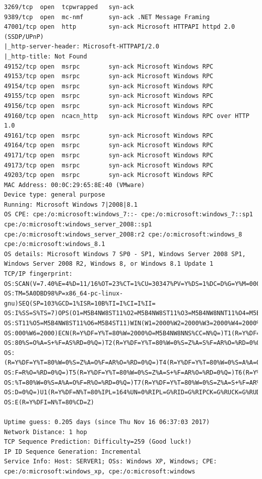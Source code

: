\documentclass[12pt,a4paper]{article}
\begin{document}
\begin{appendices}
\begin{lstlisting}
3269/tcp  open  tcpwrapped   syn-ack
9389/tcp  open  mc-nmf       syn-ack .NET Message Framing
47001/tcp open  http         syn-ack Microsoft HTTPAPI httpd 2.0 (SSDP/UPnP)
|_http-server-header: Microsoft-HTTPAPI/2.0
|_http-title: Not Found
49152/tcp open  msrpc        syn-ack Microsoft Windows RPC
49153/tcp open  msrpc        syn-ack Microsoft Windows RPC
49154/tcp open  msrpc        syn-ack Microsoft Windows RPC
49155/tcp open  msrpc        syn-ack Microsoft Windows RPC
49156/tcp open  msrpc        syn-ack Microsoft Windows RPC
49160/tcp open  ncacn_http   syn-ack Microsoft Windows RPC over HTTP 1.0
49161/tcp open  msrpc        syn-ack Microsoft Windows RPC
49164/tcp open  msrpc        syn-ack Microsoft Windows RPC
49171/tcp open  msrpc        syn-ack Microsoft Windows RPC
49173/tcp open  msrpc        syn-ack Microsoft Windows RPC
49203/tcp open  msrpc        syn-ack Microsoft Windows RPC
MAC Address: 00:0C:29:65:8E:40 (VMware)
Device type: general purpose
Running: Microsoft Windows 7|2008|8.1
OS CPE: cpe:/o:microsoft:windows_7::- cpe:/o:microsoft:windows_7::sp1 cpe:/o:microsoft:windows_server_2008::sp1 cpe:/o:microsoft:windows_server_2008:r2 cpe:/o:microsoft:windows_8 cpe:/o:microsoft:windows_8.1
OS details: Microsoft Windows 7 SP0 - SP1, Windows Server 2008 SP1, Windows Server 2008 R2, Windows 8, or Windows 8.1 Update 1
TCP/IP fingerprint:
OS:SCAN(V=7.40%E=4%D=11/16%OT=23%CT=1%CU=30347%PV=Y%DS=1%DC=D%G=Y%M=000C29%
OS:TM=5A0DBD98%P=x86_64-pc-linux-gnu)SEQ(SP=103%GCD=1%ISR=10B%TI=I%CI=I%II=
OS:I%SS=S%TS=7)OPS(O1=M5B4NW8ST11%O2=M5B4NW8ST11%O3=M5B4NW8NNT11%O4=M5B4NW8
OS:ST11%O5=M5B4NW8ST11%O6=M5B4ST11)WIN(W1=2000%W2=2000%W3=2000%W4=2000%W5=2
OS:000%W6=2000)ECN(R=Y%DF=Y%T=80%W=2000%O=M5B4NW8NNS%CC=N%Q=)T1(R=Y%DF=Y%T=
OS:80%S=O%A=S+%F=AS%RD=0%Q=)T2(R=Y%DF=Y%T=80%W=0%S=Z%A=S%F=AR%O=%RD=0%Q=)T3
OS:(R=Y%DF=Y%T=80%W=0%S=Z%A=O%F=AR%O=%RD=0%Q=)T4(R=Y%DF=Y%T=80%W=0%S=A%A=O%
OS:F=R%O=%RD=0%Q=)T5(R=Y%DF=Y%T=80%W=0%S=Z%A=S+%F=AR%O=%RD=0%Q=)T6(R=Y%DF=Y
OS:%T=80%W=0%S=A%A=O%F=R%O=%RD=0%Q=)T7(R=Y%DF=Y%T=80%W=0%S=Z%A=S+%F=AR%O=%R
OS:D=0%Q=)U1(R=Y%DF=N%T=80%IPL=164%UN=0%RIPL=G%RID=G%RIPCK=G%RUCK=G%RUD=G)I
OS:E(R=Y%DFI=N%T=80%CD=Z)

Uptime guess: 0.205 days (since Thu Nov 16 06:37:03 2017)
Network Distance: 1 hop
TCP Sequence Prediction: Difficulty=259 (Good luck!)
IP ID Sequence Generation: Incremental
Service Info: Host: SERVER1; OSs: Windows XP, Windows; CPE: cpe:/o:microsoft:windows_xp, cpe:/o:microsoft:windows


\end{lstlisting}
\end{appendices}
\end{document}
